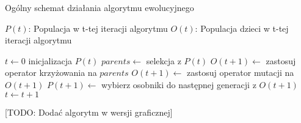 \begin{pseudokod}
\caption{Ogólny schemat działania algorytmu ewolucyjnego}
\label{alg_ewo}
    $P(t)$: Populacja w t-tej iteracji algorytmu\;
    $O(t)$: Populacja dzieci w t-tej iteracji algorytmu\;

    $t \gets 0$\;
    inicjalizacja $P(t)$\;
     {
        $parents \gets$ selekcja z $P(t)$\;
        $O(t+1) \gets$ zastosuj operator krzyżowania na $parents$\;
        $O(t+1) \gets$ zastosuj operator mutacji na $O(t+1)$\;
        $P(t+1) \gets$ wybierz osobniki do następnej generacji z $O(t+1)$\;
        $t \gets t+1$\;
    }
    \;
\end{pseudokod}

[TODO: Dodać algorytm w wersji graficznej]

